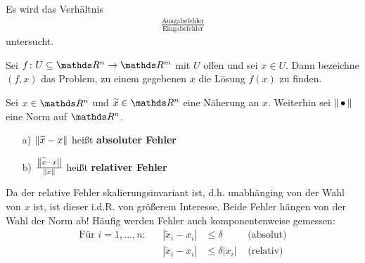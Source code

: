  \label{3.2}
Es wird das Verhältnis 
\begin{gather*}
  \frac{\text{Ausgabefehler}}{\text{Eingabefehler}}
\end{gather*}
untersucht.

\begin{Defe}
  \label{3.2.1} 
  Sei $f\colon U \subseteq \R^n \to \R^m$ mit $U$ offen und sei $x\in U$.
  Dann bezeichne $(f, x)$ das Problem, zu einem gegebenen $x$ die Lösung $f(x)$ zu finden.
\end{Defe}

\begin{Defe}
  \label{3.2.2} 
  Sei $x\in\R^n$ und $\widetilde{x} \in \R^n$ eine Näherung an $x$. 
  Weiterhin sei $\nn$ eine Norm auf $\R^n$.
  \begin{itemize}
  \item[a)] $\nn[\widetilde{x} - x]$ heißt \textbf{absoluter Fehler} 
  \item[b)] $\frac{\nn[\widetilde{x} - x]}{\nn[x]}$ heißt \textbf{relativer Fehler}
  \end{itemize}
  Da der relative Fehler skalierungsinvariant ist, d.h. unabhänging von der  Wahl von $x$ ist, ist dieser i.d.R. von größerem Interesse.
  Beide Fehler hängen von der Wahl der Norm ab!
  Häufig werden Fehler auch komponentenweise gemessen:
  \begin{align*}
    \text{Für } i=1,\ldots , n : && |\widetilde{x}_i - x_i | & \leq \delta & \text{ (absolut)} \\
                                 && |\widetilde{x}_i - x_i | &\leq \delta |x_i| & \text{ (relativ)}
  \end{align*}
\end{Defe}

